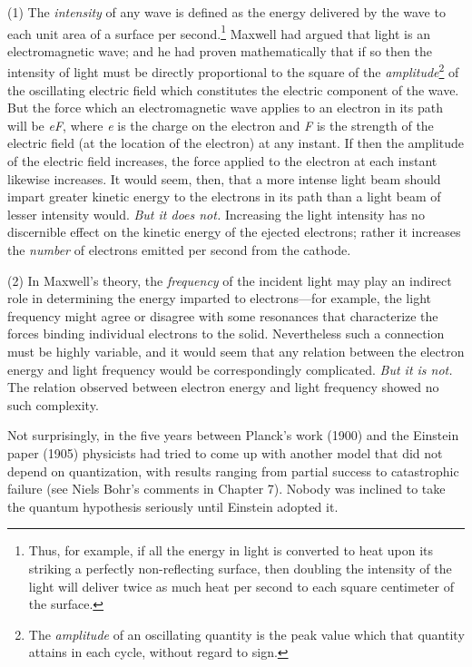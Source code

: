 (1) The \emph{intensity} of any wave is defined as the energy delivered
by the wave to each unit area of a surface per second.\footnote{Thus,
  for example, if all the energy in light is converted to heat upon its
  striking a perfectly non-reflecting surface, then doubling the
  intensity of the light will deliver twice as much heat per second to
  each square centimeter of the surface.} Maxwell had argued that light
is an electromagnetic wave; and he had proven mathematically that if so
then the intensity of light must be directly proportional to the square
of the \emph{amplitude}\footnote{The \emph{amplitude} of an oscillating
  quantity is the peak value which that quantity attains in each cycle,
  without regard to sign.} of the oscillating electric field which
constitutes the electric component of the wave. But the force which an
electromagnetic wave applies to an electron in its path will be
\emph{eF}, where \emph{e} is the charge on the electron and \emph{F} is
the strength of the electric field (at the location of the electron) at
any instant. If then the amplitude of the electric field increases, the
force applied to the electron at each instant likewise increases. It
would seem, then, that a more intense light beam should impart greater
kinetic energy to the electrons in its path than a light beam of lesser
intensity would. \emph{But it does not.} Increasing the light intensity
has no discernible effect on the kinetic energy of the ejected
electrons; rather it increases the \emph{number} of electrons emitted
per second from the cathode.

(2) In Maxwell's theory, the \emph{frequency} of the incident light may
play an indirect role in determining the energy imparted to
electrons---for example, the light frequency might agree or disagree
with some resonances that characterize the forces binding individual
electrons to the solid. Nevertheless such a connection must be highly
variable, and it would seem that any relation between the electron
energy and light frequency would be correspondingly complicated.
\emph{But it is not.} The relation observed between electron energy and
light frequency showed no such complexity.

Not surprisingly, in the five years between Planck's work (1900) and the
Einstein paper (1905) physicists had tried to come up with another model
that did not depend on quantization, with results ranging from partial
success to catastrophic failure (see Niels Bohr's comments in Chapter 7).
Nobody was inclined to take the quantum hypothesis seriously until
Einstein adopted it.

